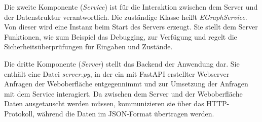 




Die zweite Komponente (\textit{Service}) ist für die Interaktion zwischen dem Server und der Datenstruktur verantwortlich. Die zuständige Klasse heißt \textit{EGraphService}. 
Von dieser wird eine Instanz beim Start des Servers erzeugt. 
Sie stellt dem Server Funktionen, wie zum Beispiel das Debugging, zur Verfügung und regelt die Sicherheitsüberprüfungen für Eingaben und Zustände. 



Die dritte Komponente (\textit{Server}) stellt das Backend der Anwendung dar. Sie enthält eine Datei \textit{server.py}, in der ein mit FastAPI erstellter Webserver
Anfragen der Weboberfläche entgegennimmt und zur Umsetzung der Anfragen mit dem Service interagiert. Da zwischen dem Server und der Weboberfläche Daten ausgetauscht werden
müssen, kommunizieren sie über das HTTP-Protokoll, während die Daten im JSON-Format übertragen werden.

